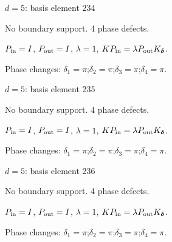 {\Large $d=5$: basis element 234}\par
No boundary support. 4 phase defects.
\begin{center}
\end{center}
\vspace{-1mm}
$P_{\rm in}=I$, \quad $P_{\rm out}=I$, \quad $\lambda=1$, \qquad $K P_{\rm in}=\lambda P_{\rm out}K_{\boldsymbol\delta}$.
\par\smallskip\begin{minipage}{.98\linewidth}\small Phase changes: $\delta_{1}=\pi$;\quad $\delta_{2}=\pi$;\quad $\delta_{3}=\pi$;\quad $\delta_{4}=\pi$.\end{minipage}
\vfill
{\footnotesize\texttt{}}
\newpage
{}
{\Large $d=5$: basis element 235}\par
No boundary support. 4 phase defects.
\begin{center}
\end{center}
\vspace{-1mm}
$P_{\rm in}=I$, \quad $P_{\rm out}=I$, \quad $\lambda=1$, \qquad $K P_{\rm in}=\lambda P_{\rm out}K_{\boldsymbol\delta}$.
\par\smallskip\begin{minipage}{.98\linewidth}\small Phase changes: $\delta_{1}=\pi$;\quad $\delta_{2}=\pi$;\quad $\delta_{3}=\pi$;\quad $\delta_{4}=\pi$.\end{minipage}
\vfill
{\footnotesize\texttt{}}
\newpage
{}
{\Large $d=5$: basis element 236}\par
No boundary support. 4 phase defects.
\begin{center}
\end{center}
\vspace{-1mm}
$P_{\rm in}=I$, \quad $P_{\rm out}=I$, \quad $\lambda=1$, \qquad $K P_{\rm in}=\lambda P_{\rm out}K_{\boldsymbol\delta}$.
\par\smallskip\begin{minipage}{.98\linewidth}\small Phase changes: $\delta_{1}=\pi$;\quad $\delta_{2}=\pi$;\quad $\delta_{3}=\pi$;\quad $\delta_{4}=\pi$.\end{minipage}
\vfill
{\footnotesize\texttt{}}
\newpage
{}
